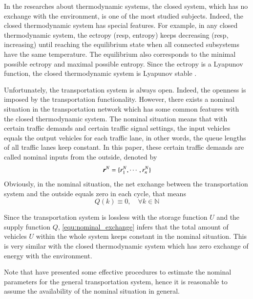 \documentclass[preprint,authoryear,12pt]{elsarticle}
\renewcommand{\vec}[1]{\mbox{\boldmath$#1$}}
\begin{document}
In the researches about thermodynamic systems, the closed system,
which has no exchange with the environment, is one of the most
studied subjects. Indeed, the closed thermodynamic system has special
features. For example, in any closed thermodynamic system, the
ectropy (resp, entropy) keeps decreasing (resp, increasing) until
reaching the equilibrium state when all connected subsystems have the
same temperature. The equilibrium also corresponds to the minimal
possible ectropy and maximal possible entropy. Since the ectropy is a
Lyapunov function, the closed thermodynamic system is Lyapunov stable
\citep{haddad_thermodynamic_2005}.

Unfortunately, the transportation system is always open. Indeed, the
openness is imposed by the transportation functionality. However,
there exists a nominal situation \citep{diakaki_multivariable_2002}
in the transportation network which has some common features with the
closed thermodynamic system. The nominal situation means that with
certain traffic demands and certain traffic signal settings, the
input vehicles equals the output vehicles for each traffic lane, in
other words, the queue lengths of all traffic lanes keep constant. In
this paper, these certain traffic demands are called nominal inputs
from the outside, denoted by
$$\vec{r}^N=\{r_1^N,\cdots,r_n^N\}$$
Obviously, in the nominal situation, the net exchange between the
transportation system and the outside equals zero in each cycle, that
means
\begin{equation}\label{equ:nominal_exchange}
Q(k)\equiv 0, \quad \forall k\in\mathbb{N}
\end{equation}

Since the transportation system is lossless with the storage function
$U$ and the supply function $Q$, \eqref{equ:nominal_exchange} infers
that the total amount of vehicles $U$ within the whole system keeps
constant in the nominal situation. This is very similar with the
closed thermodynamic system which has zero exchange of energy with
the environment.

Note that \citet{de_oliveira_multi-agent_2010} have presented some
effective procedures to estimate the nominal parameters for the
general transportation system, hence it is reasonable to assume the
availability of the nominal situation in general.
\end{document}
